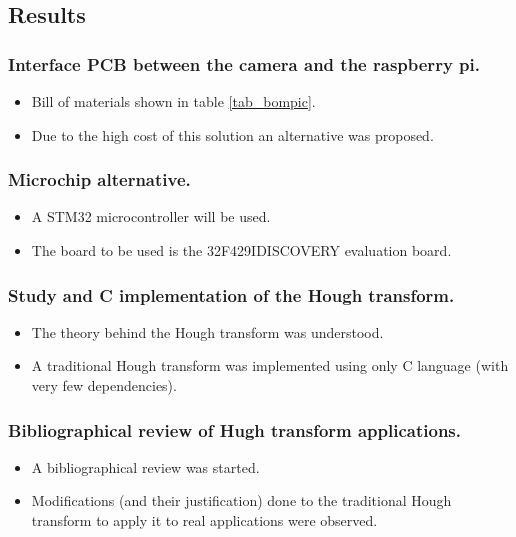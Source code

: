 
\subsection{Results}

\subsubsection{Interface PCB between the camera and the raspberry pi.}
\begin{itemize}
	\item Bill of materials shown in table \ref{tab_bompic}.
	\item Due to the high cost of this solution an alternative was proposed.
\end{itemize}

\subsubsection{Microchip alternative.}
\begin{itemize}
	\item A STM32 microcontroller will be used.
	\item The board to be used is the 32F429IDISCOVERY evaluation board.
\end{itemize}

\subsubsection{Study and C implementation of the Hough transform.}
\begin{itemize}
	\item The theory behind the Hough transform was understood.
	\item A traditional Hough transform was implemented using only C language (with very few dependencies).
\end{itemize}

\subsubsection{Bibliographical review of Hugh transform applications.}
\begin{itemize}
	\item A bibliographical review was started.
	\item Modifications (and their justification) done to the traditional Hough transform to apply it to real applications were observed.
\end{itemize}


